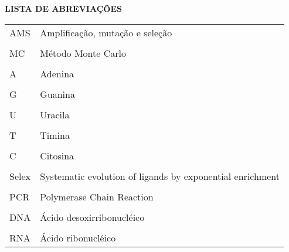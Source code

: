\begin{center}
\textsc{\textbf{\Large LISTA DE ABREVIAÇÕES }}
\end{center}
\vspace{2cm}

\begin{center}

\begin{tabular}{l|l}

AMS   & Amplificação, mutação e seleção\\\\
MC    & Método Monte Carlo\\\\
A     & Adenina\\\\
G     & Guanina\\\\
U     & Uracila\\\\
T     & Timina\\\\
C     & Citosina\\\\
Selex & Systematic evolution of ligands by exponential enrichment\\\\
PCR   & Polymerase Chain Reaction\\\\
DNA   & Ácido desoxirribonucléico\\\\
RNA   & Ácido ribonucléico
\end{tabular}

\end{center}